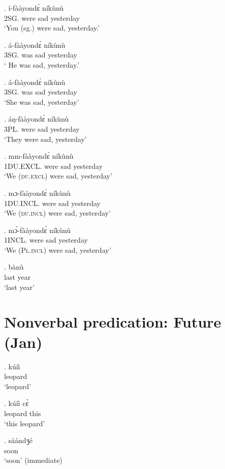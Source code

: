 \documentclass{assets/fieldnotes}
\begin{document}
{\exg. í-fààyondɛ̀ níkùnù\\
2SG. were sad yesterday\\
`You (sg.) were sad, yesterday.'

\exg. á-fààyondɛ̀ níkùnù\\
3SG. was sad yesterday\\
 ` He was sad, yesterday.'
 
\exg. á-fààyondɛ̀ níkùnù\\
3SG. was sad yesterday\\
`She was sad, yesterday'

\exg. áŋ-fààyondɛ̀ níkùnù\\
3PL. were sad yesterday\\
`They were sad, yesterday'

\exg. mm-fààyondɛ̀ níkùnù\\ 
1DU.EXCL. were sad yesterday\\
`We (\textsc{du.excl}) were sad, yesterday' 

\exg. mɔ-fààyondɛ̀ níkùnù\\
1DU.INCL. were sad yesterday\\
 `We (\textsc{du.incl}) were sad, yesterday' 

\exg. mɔ́-fààyondɛ̀ níkùnù\\
1INCL. were sad yesterday\\
 `We (\textsc{Pl.incl}) were sad, yesterday'


\exg. bànù\\
last year\\
`last year'



\section{Nonverbal predication: Future (Jan)} 


\exg. kúíì \\
leopard\\
`leopard' 


\exg. kúíì cɛ̀ \\
leopard this \\
`this leopard'

\exg. sáándʒé \\
soon \\
`soon' (immediate)

}
\end{document}
